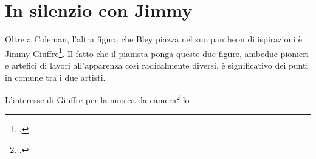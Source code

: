 \section{In silenzio con Jimmy}
Oltre a Coleman, l'altra figura che Bley piazza nel suo pantheon di ispirazioni è Jimmy Giuffre\footcite{hamilton}. Il fatto che il pianista ponga queste due figure, ambedue pionieri e artefici di lavori all'apparenza così radicalmente diversi, è significativo dei punti in comune tra i due artisti.\par
L'interesse di Giuffre per la musica da camera\footcite[389]{johnston} lo 

\appendix

